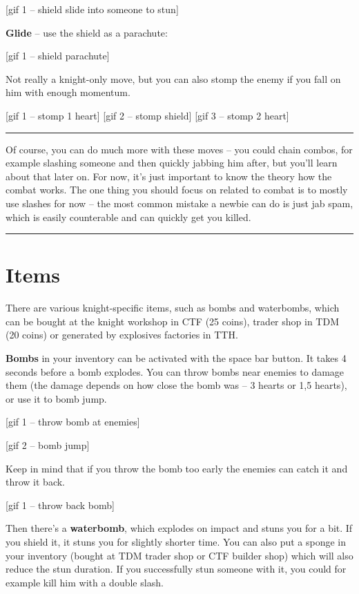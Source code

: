 \documentclass[]{book}
\begin{document}
{[}gif 1 -- shield slide into someone to stun{]}

\textbf{Glide} -- use the shield as a parachute:

{[}gif 1 -- shield parachute{]}

Not really a knight-only move, but you can also stomp the enemy if you fall on him with enough momentum.

{[}gif 1 -- stomp 1 heart{]}
{[}gif 2 -- stomp shield{]}
{[}gif 3 -- stomp 2 heart{]}

\begin{center}\rule{0.5\linewidth}{\linethickness}\end{center}

Of course, you can do much more with these moves -- you could chain combos, for example slashing someone and then quickly jabbing him after, but you'll learn about that later on. For now, it's just important to know the theory how the combat works. The one thing you should focus on related to combat is to mostly use slashes for now -- the most common mistake a newbie can do is just jab spam, which is easily counterable and can quickly get you killed.

\begin{center}\rule{0.5\linewidth}{\linethickness}\end{center}

\hypertarget{items}{%
\section{Items}\label{items}}

There are various knight-specific items, such as bombs and waterbombs, which can be bought at the knight workshop in CTF (25 coins), trader shop in TDM (20 coins) or generated by explosives factories in TTH.

\textbf{Bombs} in your inventory can be activated with the space bar button. It takes 4 seconds before a bomb explodes. You can throw bombs near enemies to damage them (the damage depends on how close the bomb was -- 3 hearts or 1,5 hearts), or use it to bomb jump.

{[}gif 1 -- throw bomb at enemies{]}

{[}gif 2 -- bomb jump{]}

Keep in mind that if you throw the bomb too early the enemies can catch it and throw it back.

{[}gif 1 -- throw back bomb{]}

Then there's a \textbf{waterbomb}, which explodes on impact and stuns you for a bit. If you shield it, it stuns you for slightly shorter time. You can also put a sponge in your inventory (bought at TDM trader shop or CTF builder shop) which will also reduce the stun duration. If you successfully stun someone with it, you could for example kill him with a double slash.
\end{document}
